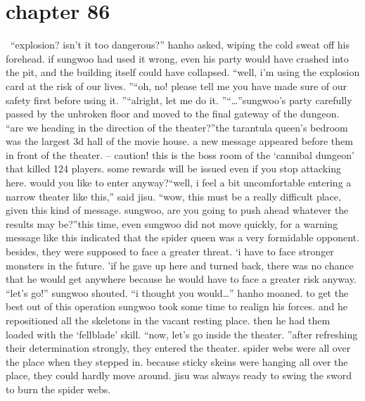 \section{chapter 86}






 “explosion? isn’t it too dangerous?” hanho asked, wiping the cold sweat off his forehead.
if sungwoo had used it wrong, even his party would have crashed into the pit, and the building itself could have collapsed.
“well, i’m using the explosion card at the risk of our lives.
”“oh, no! please tell me you have made sure of our safety first before using it.
”“alright, let me do it.
”“…”sungwoo’s party carefully passed by the unbroken floor and moved to the final gateway of the dungeon.
“are we heading in the direction of the theater?”the tarantula queen’s bedroom was the largest 3d hall of the movie house.
 a new message appeared before them in front of the theater.
– caution! this is the boss room of the ‘cannibal dungeon’ that killed 124 players.
 some rewards will be issued even if you stop attacking here.
 would you like to enter anyway?“well, i feel a bit uncomfortable entering a narrow theater like this,” said jisu.
“wow, this must be a really difficult place, given this kind of message.
 sungwoo, are you going to push ahead whatever the results may be?”this time, even sungwoo did not move quickly, for a warning message like this indicated that the spider queen was a very formidable opponent.
 besides, they were supposed to face a greater threat.
‘i have to face stronger monsters in the future.
’if he gave up here and turned back, there was no chance that he would get anywhere because he would have to face a greater risk anyway.
“let’s go!” sungwoo shouted.
“i thought you would…” hanho moaned.
to get the best out of this operation sungwoo took some time to realign his forces.
 and he repositioned all the skeletons in the vacant resting place.
 then he had them loaded with the ‘fellblade’ skill.
“now, let’s go inside the theater.
”after refreshing their determination strongly, they entered the theater.
spider webs were all over the place when they stepped in.
 because sticky skeins were hanging all over the place, they could hardly move around.
 jisu was always ready to swing the sword to burn the spider webs.

